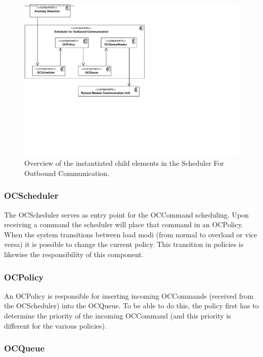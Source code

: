 \begin{figure}[H]
	\begin{centering}
		\includegraphics[width=\textwidth]{figs/add-it7-elements.pdf}
		\caption{Overview of the instantiated child elements in the Scheduler For
		Outbound Communication.}
		\label{fig:it7/elements}
	\end{centering}
\end{figure}

\subsubsection{OCScheduler}

\npar The OCScheduler serves as entry point for the OCCommand scheduling. Upon
receiving a command the scheduler will place that command in an
OCPolicy. When the system transitions between load modi (from normal
to overload or vice versa) it is possible to change the current policy.
This transition in policies is likewise the responsibility of this component.

\subsubsection{OCPolicy}

\npar An OCPolicy is responsible for inserting incoming OCCommands (received
from the OCScheduler) into the OCQueue. To be able to do this, the policy first
has to determine the priority of the incoming OCCommand (and this priority is
different for the various policies).

\subsubsection{OCQueue}

